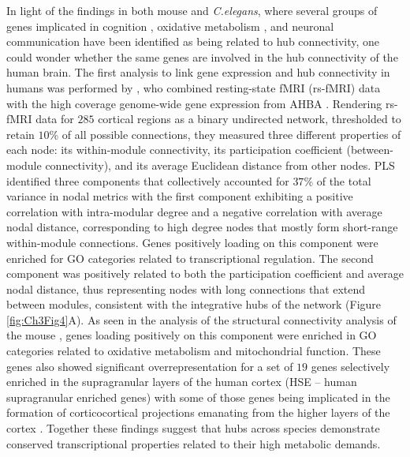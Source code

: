 In light of the findings in both mouse and \textit{C.elegans}, where several groups of genes implicated in cognition \citep{Rubinov2015c}, oxidative metabolism \citep{Fulcher2016}, and neuronal communication \citep{Arnatkeviciute2018} have been identified as being related to hub connectivity, one could wonder whether the same genes are involved in the hub connectivity of the human brain. The first analysis to link gene expression and hub connectivity in humans was performed by \citet{Vertes2016b}, who combined resting-state fMRI (rs-fMRI) data with the high coverage genome-wide gene expression from AHBA \citep{Hawrylycz2012}. 
Rendering rs-fMRI data for $285$ cortical regions as a binary undirected network, thresholded to retain $10$\% of all possible connections, they measured three different properties of each node: its within-module connectivity, its participation coefficient (between-module connectivity), and its average Euclidean distance from other nodes. 
PLS identified three components that collectively accounted for $37$\% of the total variance in nodal metrics with the first component exhibiting a positive correlation with intra-modular degree and a negative correlation with average nodal distance, corresponding to high degree nodes that mostly form short-range within-module connections. Genes positively loading on this component were enriched for GO categories related to transcriptional regulation. The second component was positively related to both the participation coefficient and average nodal distance, thus representing nodes with long connections that extend between modules, consistent with the integrative hubs of the network (Figure \ref{fig:Ch3Fig4}A).
As seen in the analysis of the structural connectivity analysis of the mouse \citep{Fulcher2016}, genes loading positively on this component were enriched in GO categories related to oxidative metabolism and mitochondrial function.  
These genes also showed significant overrepresentation for a set of $19$ genes \citep{Krienen2016} selectively enriched in the supragranular layers of the human cortex (HSE – human supragranular enriched genes) with some of those genes being implicated in the formation of corticocortical projections emanating from the higher layers of the cortex \citep{Krienen2016}. 
Together these findings suggest that hubs across species demonstrate conserved transcriptional properties related to their high metabolic demands.

